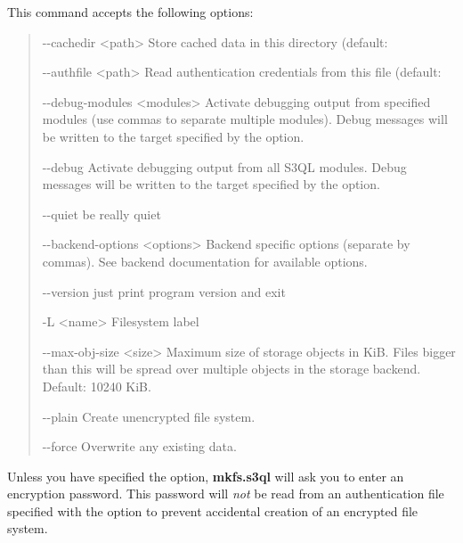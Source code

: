 \documentclass[letterpaper,10pt,english]{sphinxmanual}
\begin{document}
This command accepts the following options:
\begin{quote}
\begin{optionlist}{3cm}
\item [-{-}cachedir \textless{}path\textgreater{}]  
Store cached data in this directory (default:
\item [-{-}authfile \textless{}path\textgreater{}]  
Read authentication credentials from this file
(default: 
\item [-{-}debug-modules \textless{}modules\textgreater{}]  
Activate debugging output from specified modules (use
commas to separate multiple modules). Debug messages
will be written to the target specified by the
 option.
\item [-{-}debug]  
Activate debugging output from all S3QL modules. Debug
messages will be written to the target specified by
the  option.
\item [-{-}quiet]  
be really quiet
\item [-{-}backend-options \textless{}options\textgreater{}]  
Backend specific options (separate by commas). See
backend documentation for available options.
\item [-{-}version]  
just print program version and exit
\item [-L \textless{}name\textgreater{}]  
Filesystem label
\item [-{-}max-obj-size \textless{}size\textgreater{}]  
Maximum size of storage objects in KiB. Files bigger
than this will be spread over multiple objects in the
storage backend. Default: 10240 KiB.
\item [-{-}plain]  
Create unencrypted file system.
\item [-{-}force]  
Overwrite any existing data.
\end{optionlist}
\end{quote}

Unless you have specified the  option,
\textbf{mkfs.s3ql} will ask you to enter an encryption
password. This password will \emph{not} be read from an authentication file
specified with the  option to prevent accidental
creation of an encrypted file system.
\end{document}
